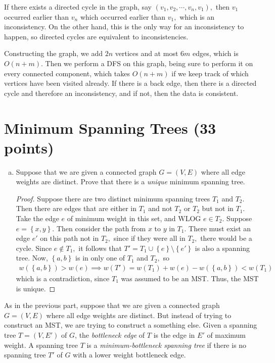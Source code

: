 \documentclass{article}
\begin{document}
\begin{soln}
	If there exists a directed cycle in the graph, say $(v_1, v_2, \cdots, v_n, v_1),$ then $v_1$ occurred earlier than $v_n$ which occurred earlier than $v_1,$ which is an inconsistency. On the other hand, this is the only way for an inconsistency to happen, so directed cycles are equivalent to inconsistencies.

	Constructing the graph, we add $2n$ vertices and at most $6m$ edges, which is $O(n+m).$ Then we perform a DFS on this graph, being sure to perform it on every connected component, which takes $O(n+m)$ if we keep track of which vertices have been visited already. If there is a back edge, then there is a directed cycle and therefore an inconsistency, and if not, then the data is consistent.
\end{soln}

\newpage
\section{Minimum Spanning Trees (33 points)}

\begin{enumerate}[(a)]
	\item Suppose that we are given a connected graph $G = (V, E)$ where all edge weights are distinct.  Prove that there is a \emph{unique} minimum spanning tree. 
		\begin{proof}
			Suppose there are two distinct minimum spanning trees $T_1$ and $T_2.$ Then there are edges that are either in $T_1$ and not $T_2$ or $T_2$ but not in $T_1.$ Take the edge $e$ of minimum weight in this set, and WLOG $e\in T_2.$ Suppose $e=\left\{ x, y \right\}.$ Then consider the path from $x$ to $y$ in $T_1.$ There must exist an edge $e'$ on this path not in $T_2,$ since if they were all in $T_2,$ there would be a cycle. Since $e\notin T_1,$ it follows that $T'=T_1\cup \left\{ e \right\}\setminus\left\{ e'\right\}$ is also a spanning tree. Now, $\left\{ a, b \right\}$ is in only one of $T_1$ and $T_2,$ so
			\begin{align*}
				w\left( \left\{ a, b \right\} \right) > w(e) \implies w(T') = w(T_1) + w(e) - w\left( \left\{ a, b \right\} \right) < w(T_1)
			\end{align*}
			which is a contradiction, since $T_1$ was assumed to be an MST. Thus, the MST is unique.
		\end{proof}
\end{enumerate}

As in the previous part, suppose that we are given a connected graph $G = (V, E)$ where all edge weights are distinct.  But instead of trying to construct an MST, we are trying to construct a something else.  Given a spanning tree $T = (V, E')$ of $G$, the \emph{bottleneck edge} of $T$ is the edge in $E'$ of maximum weight.  A spanning tree $T$ is a \emph{minimum-bottleneck spanning tree} if there is no spanning tree $T'$ of $G$ with a lower weight bottleneck edge.
\end{document}
